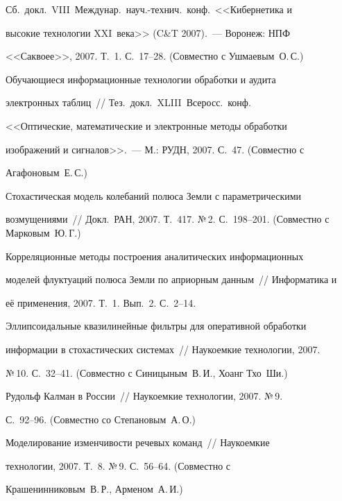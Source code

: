 Сб.\ докл.\ VIII~Междунар.\ науч.-технич.\ конф.\ <<Кибернетика и


высокие технологии XXI~века>> (C\&T 2007).~--- Воронеж: НПФ


<<Саквоее>>, 2007. Т.~1. С.~17--28. (Совместно с Ушмаевым~О.\,С.)





 Обучающиеся информационные технологии обработки и аудита


электронных таблиц~// Тез.\ докл.\ XLIII~Всеросс.\ конф.\


<<Оп\-ти\-че\-ские, математические и электронные методы обработки


изоб\-ра\-же\-ний и сигналов>>.~--- М.: РУДН, 2007. С.~47. (Совместно с


Агафоновым~Е.\,С.)





 Стохастическая модель колебаний полюса Земли с па\-ра\-мет\-рическими


возмущениями~// Докл.\ РАН, 2007. Т.~417. №\,2. С.~198--201. (Совместно с Марковым~Ю.\,Г.)





 Корреляционные методы построения аналитических информационных


моделей флуктуаций полюса Земли по априорным данным~// Информатика и


её применения, 2007. Т.~1. Вып.~2. С.~2--14.





 Эллипсоидальные квазилинейные фильтры для оперативной обработки


информации в стохастических системах~// Наукоемкие технологии, 2007.


№\,10. С.~32--41. (Совместно с Синицыным~В.\,И., Хоанг Тхо~Ши.)





 Рудольф Калман в России~// Наукоемкие технологии, 2007. №\,9.


 С.~92--96. (Совместно со Степановым~А.\,О.)





 Моделирование изменчивости речевых команд~// Наукоемкие


технологии, 2007. Т.~8. №\,9. С.~56--64. (Совместно с


Крашенинниковым~В.\,Р., Арменом~А.\,И.)





